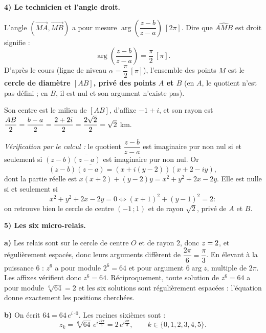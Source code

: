 \documentclass[11pt]{article}
\providecommand{\abs}{}\let\abs\relax\DeclarePairedDelimiter{\abs}{\lvert}{\rvert}
\begin{document}
\begin{exoresolu}
\textbf{4) Le technicien et l'angle droit.}

L'angle $\left(\overrightarrow{MA},\overrightarrow{MB}\right)$ a pour mesure $\arg\!\left(\dfrac{z-b}{z-a}\right)\ [2\pi]$. Dire que $\widehat{AMB}$ est droit signifie :
\[ \arg\!\left(\dfrac{z-b}{z-a}\right) = \dfrac{\pi}{2}\ [\pi]. \]
D'après le cours (ligne de niveau $\alpha = \dfrac{\pi}{2}\ [\pi]$), l'ensemble des points $M$ est le \textbf{cercle de diamètre $[AB]$, privé des points $A$ et $B$} (en $A$, le quotient n'est pas défini ; en $B$, il est nul et son argument n'existe pas).

Son centre est le milieu de $[AB]$, d'affixe $-1+i$, et son rayon est $\dfrac{AB}{2} = \dfrac{\abs{b-a}}{2} = \dfrac{\abs{2+2i}}{2} = \dfrac{2\sqrt{2}}{2} = \sqrt{2}$ km.

\emph{Vérification par le calcul :} le quotient $\dfrac{z-b}{z-a}$ est imaginaire pur non nul si et seulement si $(z-b)\overline{(z-a)}$ est imaginaire pur non nul. Or
\[ (z-b)\overline{(z-a)} = (x+i(y-2))(x+2-iy), \]
dont la partie réelle est $x(x+2)+(y-2)y = x^2+y^2+2x-2y$. Elle est nulle si et seulement si
\[ x^2+y^2+2x-2y=0 \iff (x+1)^2+(y-1)^2=2 : \]
on retrouve bien le cercle de centre $(-1\,;1)$ et de rayon $\sqrt{2}$, privé de $A$ et $B$.

\textbf{5) Les six micro-relais.}

\textbf{a)} Les relais sont sur le cercle de centre $O$ et de rayon $2$, donc $\abs{z}=2$, et régulièrement espacés, donc leurs arguments diffèrent de $\dfrac{2\pi}{6}=\dfrac{\pi}{3}$. En élevant à la puissance $6$ : $z^6$ a pour module $2^6=64$ et pour argument $6\arg z$, multiple de $2\pi$. Les affixes vérifient donc $z^6 = 64$. Réciproquement, toute solution de $z^6=64$ a pour module $\sqrt[6]{64}=2$ et les six solutions sont régulièrement espacées : l'équation donne exactement les positions cherchées.

\textbf{b)} On écrit $64 = 64\,e^{i\cdot 0}$. Les racines sixièmes sont :
\[ z_k = \sqrt[6]{64}\,e^{i\frac{2k\pi}{6}} = 2\,e^{i\frac{k\pi}{3}}, \qquad k\in\{0,1,2,3,4,5\}. \]


\end{exoresolu}
\end{document}
